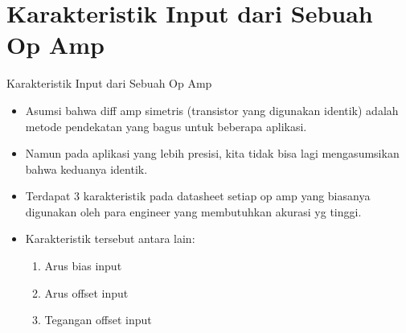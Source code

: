 \documentclass[aspectratio=169]{beamer}
\begin{document}
\section{Karakteristik Input dari Sebuah Op Amp}
\begin{frame}{Karakteristik Input dari Sebuah Op Amp}
	\begin{itemize}
		\item Asumsi bahwa diff amp simetris (transistor yang digunakan identik) adalah metode pendekatan yang bagus untuk beberapa aplikasi.
		\item Namun pada aplikasi yang lebih presisi, kita tidak bisa lagi mengasumsikan bahwa keduanya identik.
		\item Terdapat 3 karakteristik pada datasheet setiap op amp yang biasanya digunakan oleh para engineer yang membutuhkan akurasi yg tinggi.
		\item Karakteristik tersebut antara lain:
		\begin{enumerate}
			\item Arus bias input
			\item Arus offset input
			\item Tegangan offset input
		\end{enumerate}
	\end{itemize}
\end{frame}
\end{document}
